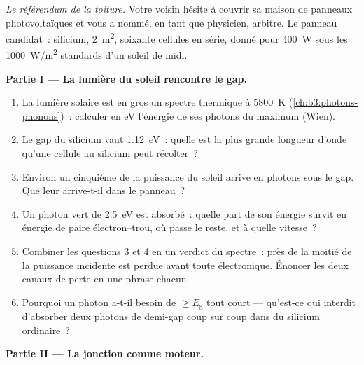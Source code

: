 \begin{problem}\label{pb:b3:electrons-in-solids:1}
\emph{Le référendum de la toiture.} Votre voisin hésite à couvrir sa
maison de panneaux photovoltaïques et vous a nommé, en tant que
physicien, arbitre. Le panneau candidat~: silicium, \qty{2}{m^2},
soixante cellules en série, donné pour \qty{400}{W} sous les
\qty{1000}{W/m^2} standards d'un soleil de midi.

\medskip\noindent\textbf{Partie I --- La lumière du soleil rencontre le gap.}

\begin{enumerate}
  \item La lumière solaire est en gros un spectre thermique à
        \qty{5800}{K} (\cref{ch:b3:photons-phonons})~: calculer en
        eV l'énergie de ses photons du maximum (Wien).
  \item Le gap du silicium vaut \qty{1.12}{eV}~: quelle est la plus
        grande longueur d'onde qu'une cellule au silicium peut
        récolter~?
  \item Environ un cinquième de la puissance du soleil arrive en
        photons sous le gap. Que leur arrive-t-il dans le panneau~?
  \item Un photon vert de \qty{2.5}{eV} est absorbé~: quelle part
        de son énergie survit en énergie de paire électron--trou,
        où passe le reste, et à quelle vitesse~?
  \item Combiner les questions 3 et 4 en un verdict du spectre~:
        près de la moitié de la puissance incidente est perdue
        avant toute électronique. Énoncer les deux canaux de perte
        en une phrase chacun.
  \item Pourquoi un photon a-t-il besoin de $\ge E_{\text{g}}$ tout
        court --- qu'est-ce qui interdit d'absorber deux photons de
        demi-gap coup sur coup dans du silicium ordinaire~?
\end{enumerate}

\medskip\noindent\textbf{Partie II --- La jonction comme moteur.}


\end{problem}
